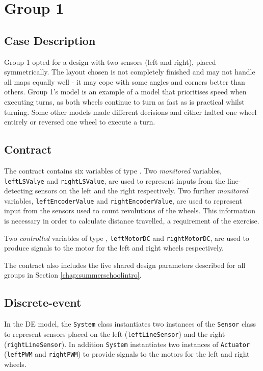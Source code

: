 \section{Group 1}

\subsection{Case Description}
Group 1 opted for a design with two sensors (left and right), placed
symmetrically.  The layout chosen is not completely finished and may
not handle all maps equally well - it may cope with some angles and
corners better than others.  Group 1's model is an example of a model
that prioritises speed when executing turns, as both wheels continue
to turn as fast as is practical whilst turning.  Some other models
made different decisions and either halted one wheel entirely or
reversed one wheel to execute a turn.

\subsection{Contract} The contract contains six variables of type
. Two \emph{monitored} variables, \texttt{leftLSValye} and
\texttt{rightLSValue}, are used to represent inputs from the
line-detecting sensors on the left and the right respectively.  Two
further \emph{monitored} variables, \texttt{leftEncoderValue} and
\texttt{right\-Encoder\-Value}, are used to represent input from the
sensors used to count revolutions of the wheels.  This information is
necessary in order to calculate distance travelled, a requirement of
the exercise.

Two \emph{controlled} variables of type ,
\texttt{leftMotorDC} and \texttt{rightMotorDC}, are used to produce
signals to the motor for the left and right wheels respectively.

The contract also includes the five shared design parameters described
for all groups in Section \ref{chap:summerschoolintro}.

\subsection{Discrete-event}
In the DE model, the \texttt{System} class instantiates two instances
of the \texttt{Sensor} class to represent sensors placed on the left
(\texttt{leftLineSensor}) and the right (\texttt{rightLineSensor}).
In addition \texttt{System} instantiates two instances of
\texttt{Actuator} (\texttt{leftPWM} and \texttt{rightPWM}) to provide
signals to the motors for the left and right wheels.

